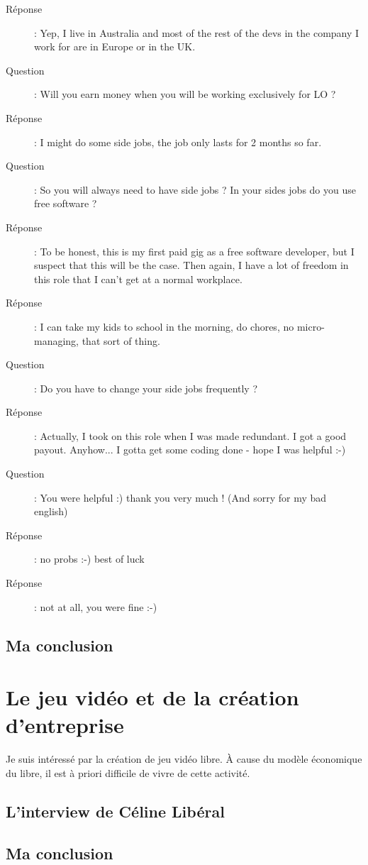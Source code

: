 \documentclass[a4paper,12pt, draft]{report}
\begin{document}
\begin{description}
\item [Réponse]:  Yep, I live in Australia and most of the rest of the devs in the company I work for are in Europe or in the UK.
\item [Question]:  Will you earn money when you will be working exclusively for LO ?
\item [Réponse]:  I might do some side jobs, the job only lasts for 2 months so far.
\item [Question]:  So you will always need to have side jobs ? In your sides jobs do you use free software ?
\item [Réponse]:  To be honest, this is my first paid gig as a free software developer, but I suspect that this will be the case. Then again, I have a lot of freedom in this role that I can't get at a normal workplace.
\item [Réponse]:  I can take my kids to school in the morning, do chores, no micro-managing, that sort of thing.
\item [Question]:  Do you have to change your side jobs frequently ?
\item [Réponse]:  Actually, I took on this role when I was made redundant. I got a good payout. Anyhow... I gotta get some coding done - hope I was helpful :-)
\item [Question]:  You were helpful :) thank you very much ! (And sorry for my bad english)
\item [Réponse]:  no probs :-) best of luck
\item [Réponse]:  not at all, you were fine :-)

\end{description}

\subsection{Ma conclusion}



\section{Le jeu vidéo et de la création d'entreprise}
Je suis intéressé par la création de jeu vidéo libre. À cause du modèle économique du libre, il est à priori difficile de vivre de cette activité.
\subsection{L'interview de Céline Libéral}
\subsection{Ma conclusion}
\end{document}
